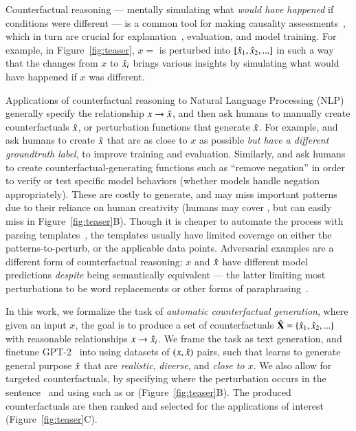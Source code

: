 Counterfactual reasoning --- mentally simulating what \emph{would have happened} if conditions were different --- is a common tool for making causality assessments~\cite{kahneman}, which in turn are crucial for explanation~\cite{miller}, evaluation, and model training. For example, in Figure~\ref{fig:teaser}, $x=$  is perturbed into $[\hat{x}_1, \hat{x}_2, ...]$ in such a way that the changes from $x$ to $\hat{x}_i$ brings various insights by simulating what would have happened if $x$ was different.

Applications of counterfactual reasoning to Natural Language Processing (NLP) generally specify the relationship $x \rightarrow \hat{x}$, and then ask humans to manually create counterfactuals $\hat{x}$, or perturbation functions that generate $\hat{x}$.
For example, \citet{gardner2020contrast} and \citet{kaushik2019learning} ask humans to create $\hat{x}$ that are as close to $x$ as possible \emph{but have a different groundtruth label}, to improve training and evaluation. 
Similarly, \citet{wu2019errudite} and \citet{checklist:acl20} ask humans to create counterfactual-generating functions such as ``remove negation'' in order to verify or test specific model behaviors (\eg whether models handle negation appropriately).
These are costly to generate, and may miss important patterns due to their reliance on human creativity (\eg humans may cover , but can easily miss  in Figure~\ref{fig:teaser}B).
Though it is cheaper to automate the process with parsing templates~\cite{li2020linguistically}, the templates usually have limited coverage on either the patterns-to-perturb, or the applicable data points.
Adversarial examples are a different form of counterfactual reasoning: $x$ and $\hat{x}$ have different model predictions \emph{despite} being semantically equivalent --- the latter limiting most perturbations to be word replacements or other forms of paraphrasing~\cite{iyyer2018adversarial, ribeiro2018semantically}.



In this work, we formalize the task of \emph{automatic counterfactual generation}, where given an input $x$, the goal is to produce a set of counterfactuals $\hat{\mathbf{X}} = \{\hat{x}_1, \hat{x}_2, ...\}$ with reasonable relationships $x \rightarrow \hat{x}_i$. 
We frame the task as text generation, and finetune GPT-2~\cite{radford2019language} into \sysname using datasets of  $(x, \hat{x})$ pairs, such that \sysname learns to generate general purpose $\hat{x}$ that are \emph{realistic}, \emph{diverse}, and \emph{close to $x$}.
We also allow for targeted counterfactuals, by specifying where the perturbation occurs in the sentence~\cite{donahue2020enabling} and using \tagstrs such as  or  (Figure~\ref{fig:teaser}B). 
The produced counterfactuals are then ranked and selected for the applications of interest (Figure~\ref{fig:teaser}C).

